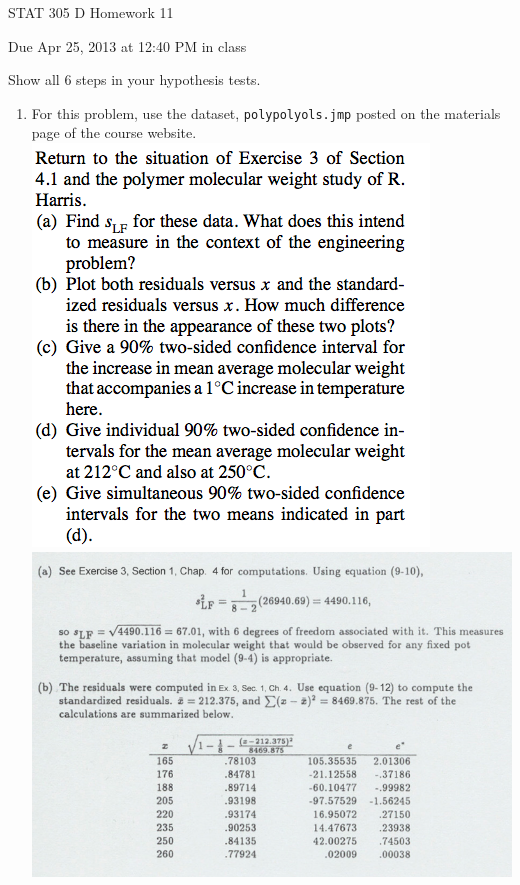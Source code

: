 \documentclass{article}\usepackage{graphicx, color}
\providecommand{\q}{$\quad$ \newline}
\numberwithin{equation}{section}
\begin{document}
\begin{flushleft}
\begin{center} \LARGE
STAT 305 D Homework 11
\end{center}
\begin{center} \Large
Due Apr 25, 2013 at 12:40 PM in class
\end{center}
{\color{red} Show all 6 steps in your hypothesis tests.}
\normalsize


\begin{enumerate}[1. ]
\LARGE
\item  For this problem, use the dataset, {\tt polypolyols.jmp} posted on the materials page of the course website.  \q
{} \includegraphics{../../fig/h11p1.png}
 \includegraphics{../../fig/h11p1sol1.png}

\end{enumerate}
\end{flushleft}
\end{document}
